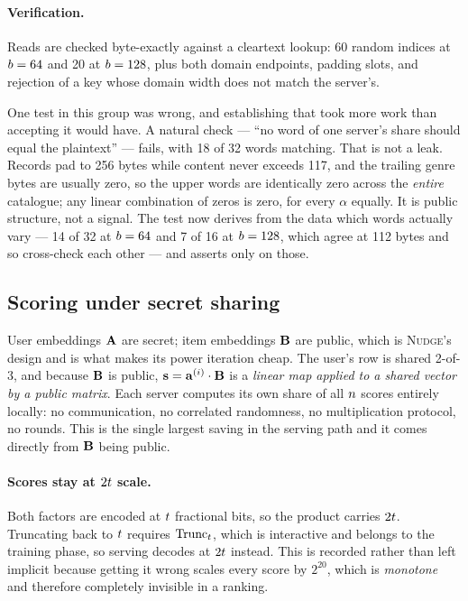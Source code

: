 \paragraph{Verification.} Reads are checked byte-exactly against a cleartext
lookup: 60 random indices at $b = 64$ and 20 at $b = 128$, plus both
domain endpoints, padding slots, and rejection of a key whose domain width does
not match the server's.

One test in this group was wrong, and establishing that took more work than
accepting it would have. A natural check --- ``no word of one server's share
should equal the plaintext'' --- fails, with 18 of 32 words matching. That is
not a leak. Records pad to 256 bytes while content never exceeds 117, and the
trailing genre bytes are usually zero, so the upper words are identically zero
across the \emph{entire} catalogue; any linear combination of zeros is zero,
for every $\alpha$ equally. It is public structure, not a signal. The test now
derives from the data which words actually vary --- 14 of 32 at $b = 64$
and 7 of 16 at $b = 128$, which agree at 112 bytes and so cross-check each
other --- and asserts only on those.

\subsection{Scoring under secret sharing}
\label{sec:tech:pir:serving}

User embeddings $\mathbf{A}$ are secret; item embeddings $\mathbf{B}$ are
public, which is \textsc{Nudge}'s design and is what makes its power iteration
cheap. The user's row is shared 2-of-3, and because $\mathbf{B}$ is public,
$\mathbf{s} = \mathbf{a}^{(i)} \cdot \mathbf{B}$ is a \emph{linear map applied to a
shared vector by a public matrix}. Each server computes its own share of all
$n$ scores entirely locally: no communication, no correlated randomness,
no multiplication protocol, no rounds. This is the single largest saving in the
serving path and it comes directly from $\mathbf{B}$ being public.

\paragraph{Scores stay at $2t$ scale.} Both factors are encoded at
$t$ fractional bits, so the product carries $2t$. Truncating
back to $t$ requires $\mathrm{Trunc}_t$, which is interactive
and belongs to the training phase, so serving decodes at $2t$ instead.
This is recorded rather than left implicit because getting it wrong scales
every score by $2^{20}$, which is \emph{monotone} and therefore completely
invisible in a ranking.

